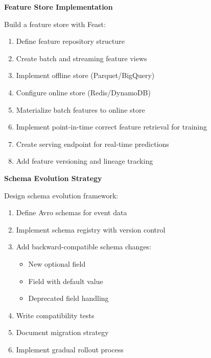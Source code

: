 \begin{exercise}
\textbf{Feature Store Implementation}

Build a feature store with Feast:

\begin{enumerate}
    \item Define feature repository structure
    \item Create batch and streaming feature views
    \item Implement offline store (Parquet/BigQuery)
    \item Configure online store (Redis/DynamoDB)
    \item Materialize batch features to online store
    \item Implement point-in-time correct feature retrieval for training
    \item Create serving endpoint for real-time predictions
    \item Add feature versioning and lineage tracking
\end{enumerate}
\end{exercise}

\begin{exercise}
\textbf{Schema Evolution Strategy}

Design schema evolution framework:

\begin{enumerate}
    \item Define Avro schemas for event data
    \item Implement schema registry with version control
    \item Add backward-compatible schema changes:
    \begin{itemize}
        \item New optional field
        \item Field with default value
        \item Deprecated field handling
    \end{itemize}
    \item Write compatibility tests
    \item Document migration strategy
    \item Implement gradual rollout process
\end{enumerate}
\end{exercise}

